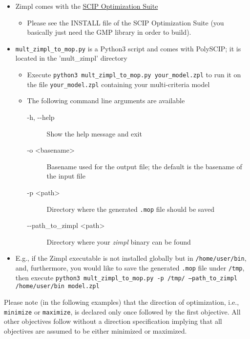 \documentclass[11pt,listof=totoc]{scrartcl}
\theoremstyle{definition}
\begin{document}
\begin{itemize}
\item Zimpl comes with the \href{http://scip.zib.de/#scipoptsuite}{SCIP Optimization Suite}
\begin{itemize}
\item Please see the INSTALL file of the SCIP Optimization Suite (you
  basically just need the GMP library in order to build).
\end{itemize}
\item \texttt{mult\_zimpl\_to\_mop.py} is a Python3 script and comes with PolySCIP; it is located in the 'mult\_zimpl' directory
\begin{itemize}
\item Execute \texttt{python3 mult\_zimpl\_to\_mop.py your\_model.zpl} to run it on the file \texttt{your\_model.zpl} containing your multi-criteria model
\item The following command line arguments are available
\begin{description}
\item[-h, -{}-help] Show the help message and exit
\item[-o <basename>] Basename used for the output file; the
  default is the basename of the input file
\item[-p <path>] Directory where the generated \texttt{.mop} file should be saved
\item[-{}-path\_to\_zimpl <path>] Directory where your \emph{zimpl} binary can be found
\end{description}
\end{itemize}
\item[] E.g., if the Zimpl executable is not installed globally but in
  \texttt{/home/user/bin}, and, furthermore, you would like to save
  the generated \texttt{.mop} file under \texttt{/tmp}, then execute
  \texttt{python3 mult\_zimpl\_to\_mop.py -p /tmp/ --path\_to\_zimpl
    /home/user/bin model.zpl}
\end{itemize}

Please note (in the following examples) that the direction of optimization,
i.e., \texttt{minimize} or \texttt{maximize}, is declared only once
followed by the first objective. All other objectives follow without a
direction specification implying that all objectives are assumed to be
either minimized or maximized.
\end{document}
